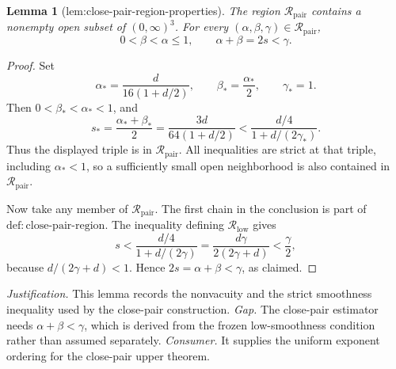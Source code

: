 \documentclass{article}
\newtheorem{lemma}{Lemma}
\begin{document}
\begin{lemma}[lem:close-pair-region-properties]\label{lem:close-pair-region-properties}
The region \(\mathcal R_{\mathrm{pair}}\) contains a nonempty open subset of
\((0,\infty)^3\).  For every
\((\alpha,\beta,\gamma)\in\mathcal R_{\mathrm{pair}}\),
\[
0<\beta<\alpha\leq1,
\qquad
\alpha+\beta=2s<\gamma.
\]
\end{lemma}
\begin{proof}
Set
\[
\alpha_* = \frac{d}{16(1+d/2)},
\qquad
\beta_* = \frac{\alpha_*}{2},
\qquad
\gamma_* = 1.
\]
Then \(0<\beta_*<\alpha_*<1\), and
\[
s_* =\frac{\alpha_*+\beta_*}{2}
=\frac{3d}{64(1+d/2)}
<\frac{d/4}{1+d/(2\gamma_*)}.
\]
Thus the displayed triple is in \(\mathcal R_{\mathrm{pair}}\).  All
inequalities are strict at that triple, including \(\alpha_*<1\), so a
sufficiently small open neighborhood is also contained in
\(\mathcal R_{\mathrm{pair}}\).

Now take any member of \(\mathcal R_{\mathrm{pair}}\).  The first chain in
the conclusion is part of \(\mathrm{def:close\mbox{-}pair\mbox{-}region}\).
The inequality defining \(\mathcal R_{\mathrm{low}}\) gives
\[
s<\frac{d/4}{1+d/(2\gamma)}
=\frac{d\gamma}{2(2\gamma+d)}
<\frac\gamma2,
\]
because \(d/(2\gamma+d)<1\).  Hence
\(2s=\alpha+\beta<\gamma\), as claimed.
\end{proof}
\par\smallskip\noindent \textit{Justification.} This lemma records the nonvacuity and the strict smoothness inequality used by the close-pair construction. \textit{Gap.} The close-pair estimator needs \(\alpha+\beta<\gamma\), which is derived from the frozen low-smoothness condition rather than assumed separately. \textit{Consumer.} It supplies the uniform exponent ordering for the close-pair upper theorem.
\end{document}
